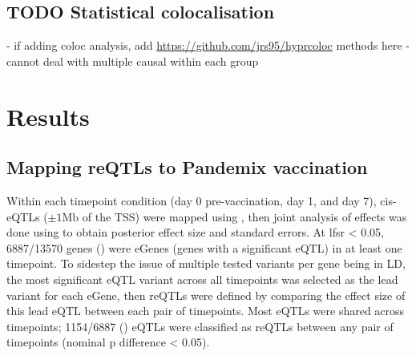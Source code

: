 \subsection{TODO Statistical colocalisation}

%
- if adding coloc analysis, add \url{https://github.com/jrs95/hyprcoloc} methods here
- cannot deal with multiple causal within each group

\section{Results}

\subsection{Mapping reQTLs to Pandemix vaccination}

Within each timepoint condition (day 0 pre-vaccination, day 1, and day 7), cis-\glspl{eQTL} ($\pm 1 \text{Mb}$ of the \gls{TSS}) were mapped using ,
then joint analysis of effects was done using  to obtain posterior effect size and standard errors.
At \gls{lfsr} < 0.05, 6887/13570 genes () were eGenes (genes with a significant \gls{eQTL}) in at least one timepoint.
To sidestep the issue of multiple tested variants per gene being in \gls{LD},
the most significant \gls{eQTL} variant across all timepoints was selected as the lead variant for each eGene,
then \glspl{reQTL} were defined by comparing the effect size of this lead \gls{eQTL} between each pair of timepoints.
Most \glspl{eQTL} were shared across timepoints; 1154/6887 () \glspl{eQTL} were classified as \glspl{reQTL} between any pair of timepoints (nominal p difference < 0.05).

